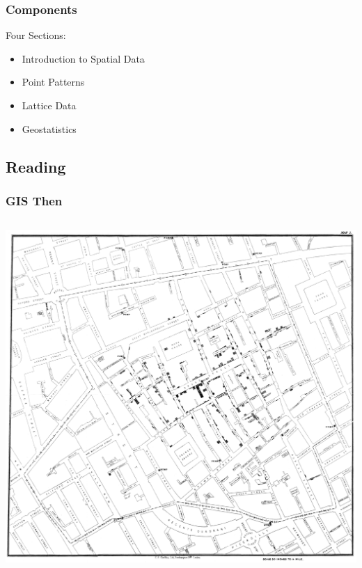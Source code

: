 \documentclass{beamer}
\begin{document}
\begin{frame}
\frametitle{Components}

\begin{block}{{Four Sections:}}

\begin{itemize}
\item<2,6> Introduction to Spatial Data
\item<3,6> Point Patterns
\item<4,6> Lattice Data
\item<5,6> Geostatistics
\end{itemize}

\end{block}

\end{frame}

\subsection{Reading}


\begin{frame}
\frametitle{GIS Then}


\begin{columns}

\centerline{\includegraphics[width=0.500000\linewidth,keepaspectratio]{snowmap1.pdf}}

\end{columns}

\end{frame}
\end{document}

